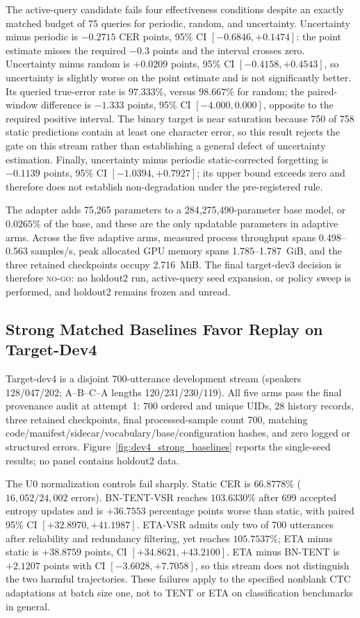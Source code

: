 The active-query candidate fails four effectiveness conditions despite an exactly matched budget of 75 queries for periodic, random, and uncertainty. Uncertainty minus periodic is $-0.2715$ CER points, 95\% CI $[-0.6846,+0.1474]$: the point estimate misses the required $-0.3$ points and the interval crosses zero. Uncertainty minus random is $+0.0209$ points, 95\% CI $[-0.4158,+0.4543]$, so uncertainty is slightly worse on the point estimate and is not significantly better. Its queried true-error rate is $97.333\%$, versus $98.667\%$ for random; the paired-window difference is $-1.333$ points, 95\% CI $[-4.000,0.000]$, opposite to the required positive interval. The binary target is near saturation because 750 of 758 static predictions contain at least one character error, so this result rejects the gate on this stream rather than establishing a general defect of uncertainty estimation. Finally, uncertainty minus periodic static-corrected forgetting is $-0.1139$ points, 95\% CI $[-1.0394,+0.7927]$; its upper bound exceeds zero and therefore does not establish non-degradation under the pre-registered rule.

The adapter adds 75,265 parameters to a 284,275,490-parameter base model, or $0.0265\%$ of the base, and these are the only updatable parameters in adaptive arms. Across the five adaptive arms, measured process throughput spans 0.498--0.563 samples/s, peak allocated GPU memory spans 1.785--1.787~GiB, and the three retained checkpoints occupy 2.716~MiB. The final target-dev3 decision is therefore \textsc{no-go}: no holdout2 run, active-query seed expansion, or policy sweep is performed, and holdout2 remains frozen and unread.

\subsection{Strong Matched Baselines Favor Replay on Target-Dev4}

Target-dev4 is a disjoint 700-utterance development stream (speakers 128/047/202; A--B--C--A lengths 120/231/230/119). All five arms pass the final provenance audit at attempt~1: 700 ordered and unique UIDs, 28 history records, three retained checkpoints, final processed-sample count 700, matching code/manifest/sidecar/vocabulary/base/configuration hashes, and zero logged or structured errors. Figure~\ref{fig:dev4_strong_baselines} reports the single-seed results; no panel contains holdout2 data.

The U0 normalization controls fail sharply. Static CER is $66.8778\%$ ($16{,}052/24{,}002$ errors). BN-TENT-VSR reaches $103.6330\%$ after 699 accepted entropy updates and is $+36.7553$ percentage points worse than static, with paired 95\% CI $[+32.8970,+41.1987]$. ETA-VSR admits only two of 700 utterances after reliability and redundancy filtering, yet reaches $105.7537\%$; ETA minus static is $+38.8759$ points, CI $[+34.8621,+43.2100]$. ETA minus BN-TENT is $+2.1207$ points with CI $[-3.6028,+7.7058]$, so this stream does not distinguish the two harmful trajectories. These failures apply to the specified nonblank CTC adaptations at batch size one, not to TENT or ETA on classification benchmarks in general.

